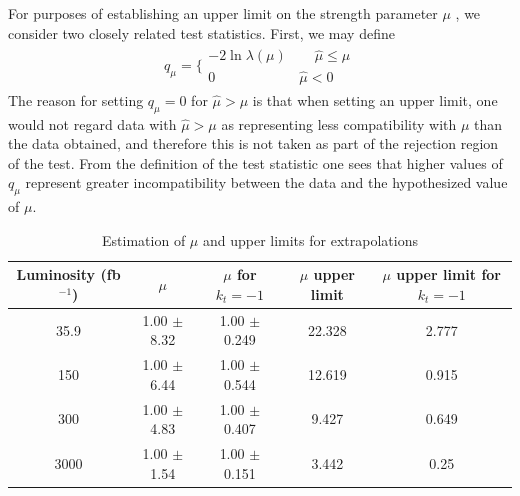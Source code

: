 For purposes of establishing an upper limit on the strength parameter $\mu$ , we consider two
closely related test statistics. First, we may define
\begin{align}
q_{\mu}=  \Big\{    \begin{array}{ll}
-2\ln\lambda(\mu) \qquad \hat{\mu} \leq \mu	\\
0  \qquad \qquad \qquad \hat{\mu}< 0
\end{array}
\end{align}
The reason for setting $q_\mu = 0$
for $\hat{\mu}>\mu $ is that when setting an upper limit, one would not regard data with $\hat{\mu}>\mu $ as
representing less compatibility with $\mu$ than the data obtained, and therefore this is not taken
as part of the rejection region of the test. From the definition of the test statistic one sees that
higher values of $q_\mu$ represent greater incompatibility between the data and the hypothesized
value of $\mu$.



\begin{table}[ht!]
	\caption{Estimation of $\mu$ and upper limits  for extrapolations}
	\begin{tabular}{|c|c|c|c|c|}
		\hline
		Luminosity (fb$^{-1}$)	&$\mu$ &$\mu$ for $k_t=-1$ &$\mu$ upper limit &$\mu$ upper limit for $k_t=-1$ \\
		\hline
		35.9 & 1.00 $\pm$  8.32 & 1.00 $\pm$  0.249&	22.328 & 2.777   \\
		\hline
		150& 1.00 $\pm$  6.44 & 1.00 $\pm$  0.544  &12.619 &0.915 \\
		\hline
		300&1.00 $\pm$  4.83 &1.00 $\pm$  0.407 & 9.427&0.649 \\
		\hline
		3000&1.00 $\pm$  1.54 & 1.00 $\pm$  0.151&	 3.442 & 0.25
		\\
		\hline
	\end{tabular}
\end{table}


